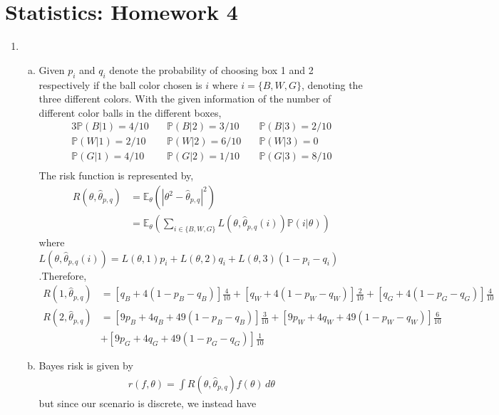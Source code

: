 \documentclass[a4paper,10pt]{article}
\theoremstyle{definition}
\begin{document}
\section*{Statistics: Homework 4}

\begin{enumerate}
\item 


\begin{enumerate}[(a)]
\item 
Given $p_i$ and $q_i$ denote the probability of choosing box 1 and 2 respectively if the ball color chosen is $i$ where $i=\{B, W ,G\}$, denoting the three different colors.  With the given information of the number of different color balls in the different boxes,
\begin{alignat*}{3}
\mathbb{P}(B|1)=4/10&\quad \mathbb{P}(B|2)=3/10&\quad \mathbb{P}(B|3)=2/10\\
\mathbb{P}(W|1)=2/10&\quad \mathbb{P}(W|2)=6/10&\quad \mathbb{P}(W|3)=0\\
\mathbb{P}(G|1)=4/10&\quad \mathbb{P}(G|2)=1/10&\quad \mathbb{P}(G|3)=8/10\\
\end{alignat*}
The risk function is represented by,
\begin{align*}
R(\theta,\hat{\theta}_{p,q}) &= \mathbb{E}_{\theta}(|\theta^2-\hat{\theta}_{p,q}|^2)\\
&=\mathbb{E}_{\theta}\left(\sum_{i\in\{B,W,G\}}L(\theta,\hat{\theta}_{p,q}(i))\mathbb{P}(i|\theta)\right)
\end{align*}
where $L(\theta,\hat{\theta}_{p,q}(i))=L(\theta,1)p_i+L(\theta,2)q_i+L(\theta,3)(1-p_i-q_i)$.Therefore,
\begin{align*}
R(1,\hat{\theta}_{p,q}) &= [q_B+4(1-p_B-q_B)]\frac{4}{10}+[q_W+4(1-p_W-q_W)]\frac{2}{10}+[q_G+4(1-p_G-q_G)]\frac{4}{10}\\
R(2,\hat{\theta}_{p,q}) &= [9p_B+4q_B+49(1-p_B-q_B)]\frac{3}{10}+[9p_W+4q_W+49(1-p_W-q_W)]\frac{6}{10}\\
&+[9p_G+4q_G+49(1-p_G-q_G)]\frac{1}{10}
\end{align*}
\item Bayes risk is given by
\begin{align*}
r(f,\theta)=\int R(\theta,\hat{\theta}_{p,q})f(\theta)\,d\theta
\end{align*}
but since our scenario is discrete, we instead have
\begin{align*}

\end{align*}
\end{enumerate}
\end{enumerate}
\end{document}
